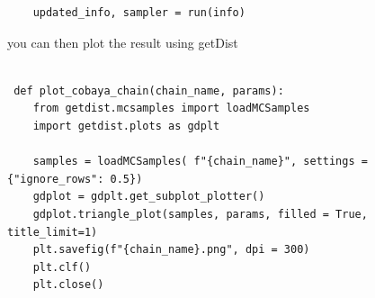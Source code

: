 \documentclass[a4paper]{article}
\newcommand{\subscript}[2]{$#1 _ #2$}
\begin{document}
\begin{enumerate}[label=(\subscript{I}{{\arabic*}})]
\begin{lstlisting}
    updated_info, sampler = run(info)
\end{lstlisting}

you can then plot the result using getDist 
 
  \begin{lstlisting}

 def plot_cobaya_chain(chain_name, params):
    from getdist.mcsamples import loadMCSamples
    import getdist.plots as gdplt

    samples = loadMCSamples( f"{chain_name}", settings = {"ignore_rows": 0.5})
    gdplot = gdplt.get_subplot_plotter()
    gdplot.triangle_plot(samples, params, filled = True, title_limit=1)
    plt.savefig(f"{chain_name}.png", dpi = 300)
    plt.clf()
    plt.close()
\end{lstlisting}
\end{enumerate}
\end{document}
